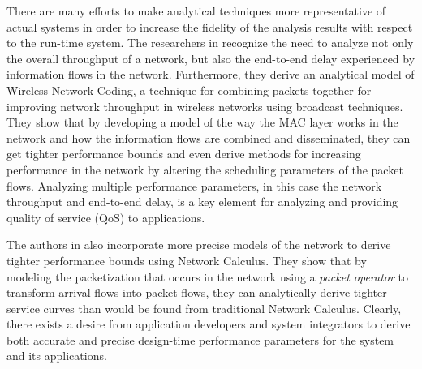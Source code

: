 There are many efforts to make analytical techniques more
representative of actual systems in order to increase the fidelity of
the analysis results with respect to the run-time system.  The
researchers in \cite{NCnetworkCoding} recognize the need to analyze
not only the overall throughput of a network, but also the end-to-end
delay experienced by information flows in the network.  Furthermore,
they derive an analytical model of Wireless Network
Coding\cite{networkcodingCOPE}, a technique for combining packets
together for improving network throughput in wireless networks using
broadcast techniques.  They show that by developing a model of the way
the MAC layer works in the network and how the information flows are
combined and disseminated, they can get tighter performance bounds and
even derive methods for increasing performance in the network by
altering the scheduling parameters of the packet flows.  Analyzing
multiple performance parameters, in this case the network throughput
and end-to-end delay, is a key element for analyzing and providing
quality of service (QoS) to applications.

The authors in \cite{NCpacketcurve2012} also incorporate more precise
models of the network to derive tighter performance bounds using
Network Calculus.  They show that by modeling the packetization that
occurs in the network using a \textit{packet operator} to transform
arrival flows into packet flows, they can analytically derive tighter
service curves than would be found from traditional Network Calculus.
Clearly, there exists a desire from application developers and system
integrators to derive both accurate and precise design-time
performance parameters for the system and its applications.

